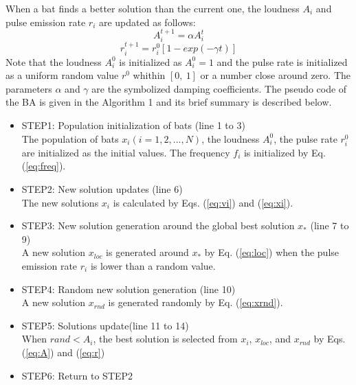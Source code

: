 When a bat finds a better solution than the current one, the loudness $A_i$ and pulse emission rate $r_i$ are updated as follows:
\begin{equation}
A_i^{t+1}=\alpha A_i^t
\label{eq:A}
\end{equation}
\begin{equation}
r_i^{t+1}=r_i^0[1-exp(-\gamma t)]
\label{eq:r}
\end{equation}
Note that the loudness $A_i^0$ is initialized as $A_i^0=1$ and the pulse rate is initialized as a uniform random value $r^0$ whithin $[0, \ 1]$ or a number close around zero. The parameters $\alpha$ and $\gamma$ are the symbolized damping coefficients. The pseudo code of the BA is given in the Algorithm 1 and its brief summary is described below.

\begin{itemize}
\item STEP1: Population initialization of bats (line 1 to 3)\\
The population of bats ${x_i}(i=1, 2, ..., N)$, the loudness ${A_i^0}$, the pulse rate ${r_i^0}$ are initialized as the initial values. The frequency ${f_i}$ is initialized by Eq.(\ref{eq:freq}).
\item STEP2: New solution updates (line 6)\\
The new solutions ${x_i}$ is calculated by Eqs. (\ref{eq:vi}) and (\ref{eq:xi}).
\item STEP3: New solution generation around the global best solution ${x_*}$ (line 7 to 9)\\
A new solution $x_{loc}$ is generated around $x_*$ by Eq. (\ref{eq:loc}) when the pulse emission rate $r_i$ is lower than a random value.
\item STEP4: Random new solution generation (line 10)\\
A new solution ${x_{rnd}}$ is generated randomly by Eq. (\ref{eq:xrnd}).  
\item STEP5: Solutions update(line 11 to 14)\\
When ${rand < A_i}$, the best solution is selected from $x_i$, ${x_{loc}}$, and ${x_{rnd}}$ by Eqs.(\ref{eq:A}) and (\ref{eq:r})
\item STEP6: Return to STEP2 
\end{itemize}

